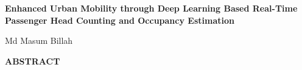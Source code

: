 \documentclass[12pt,a4paper]{report}
\begin{document}
\setcounter{page}{1}

\begin{center}
    {\fontsize{18}{22}\selectfont\bfseries
    Enhanced Urban Mobility through Deep Learning Based Real-Time Passenger Head Counting and Occupancy Estimation\par}

    \vspace{6pt}

    {\fontsize{12}{15}\selectfont
    Md Masum Billah\par}

    \vspace{18pt}
\end{center}

{
    \let\clearpage\relax
\begin{center}
	{\Large\bfseries ABSTRACT}
\end{center}

}
\end{document}
